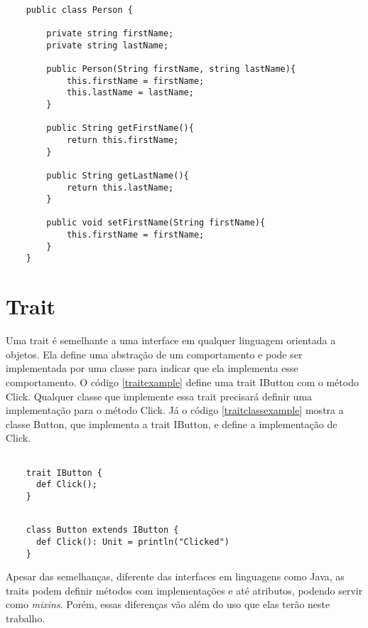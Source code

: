 \begin{lstlisting}[caption={Construtor Simples em Java},label=javaimmutableattr]

    public class Person {
        
        private string firstName;
        private string lastName;
        
        public Person(String firstName, string lastName){
            this.firstName = firstName;
            this.lastName = lastName;
        }
        
        public String getFirstName(){
            return this.firstName;
        }
        
        public String getLastName(){
            return this.lastName;
        }
        
        public void setFirstName(String firstName){
            this.firstName = firstName;
        }
    }

\end{lstlisting}


\section{Trait}

Uma trait é semelhante a uma interface em qualquer 
linguagem orientada a objetos. Ela define uma abstração 
de um comportamento e pode ser implementada por uma 
classe para indicar que ela implementa esse comportamento.\cite{ordesky2008} 
O código \ref{traitexample} define uma trait IButton com 
o método Click. Qualquer classe que implemente essa trait 
precisará definir uma implementação para o método Click. 
Já o código \ref{traitclassexample} mostra a classe 
Button, que implementa a trait IButton, e define a 
implementação de Click.

\begin{lstlisting}[caption={Exemplo de Trait},label=traitexample]

    trait IButton {
      def Click();
    }

\end{lstlisting}

\begin{lstlisting}[caption={Exemplo de classe que implementa uma trait},label=traitclassexample]

    class Button extends IButton {
      def Click(): Unit = println("Clicked")
    }

\end{lstlisting}

Apesar das semelhanças, diferente das interfaces em 
linguagens como Java, as traits podem definir métodos 
com implementações e até atributos, podendo servir 
como \textit{mixins}\cite{wampler2021}. Porém, essas 
diferenças vão além do uso que elas terão neste 
trabalho.


